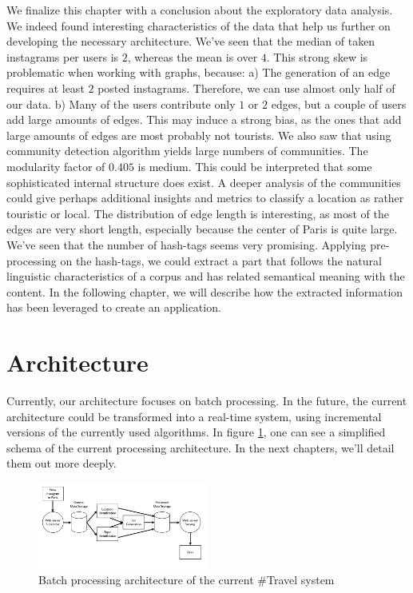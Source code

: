 We finalize this chapter with a conclusion about the exploratory data analysis. We indeed found  interesting characteristics of the data that help us further on developing the necessary architecture. We've seen that the median of taken instagrams per users is $2$, whereas the mean is over $4$. This strong skew is problematic when working with graphs, because: a) The generation of an edge requires at least $2$ posted instagrams. Therefore, we can use almost only half of our data. b) Many of the users contribute only $1$ or $2$ edges, but a couple of users add large amounts of edges. This may induce a strong bias, as the ones that add large amounts of edges are most probably not tourists. We also saw that using community detection algorithm yields large numbers of communities. The modularity factor of $0.405$ is medium. This could be interpreted that some sophisticated internal structure does exist. A deeper analysis of the communities could give perhaps additional insights and metrics to classify a location as rather touristic or local. The distribution of edge length is interesting, as most of the edges are very short length, especially because the center of Paris is quite large. We've seen that the number of hash-tags seems very promising. Applying pre-processing on the hash-tags, we could extract a part that follows the natural linguistic characteristics of a corpus and has related semantical meaning with the content. In the following chapter, we will describe how the extracted information has been leveraged to create an application.

\section{Architecture}

Currently, our architecture focuses on batch processing. In the future, the current architecture could be transformed into a real-time system, using incremental versions of the currently used algorithms. In figure \ref{fig:architecture}, one can see a simplified schema of the current processing architecture. In the next chapters, we'll detail them out more deeply.

\begin{figure}[h!]
  \centering
    \includegraphics[width=0.5\textwidth]{images/architecture}
  \caption{Batch processing architecture of the current \#Travel system}
  \label{fig:architecture}
\end{figure}

